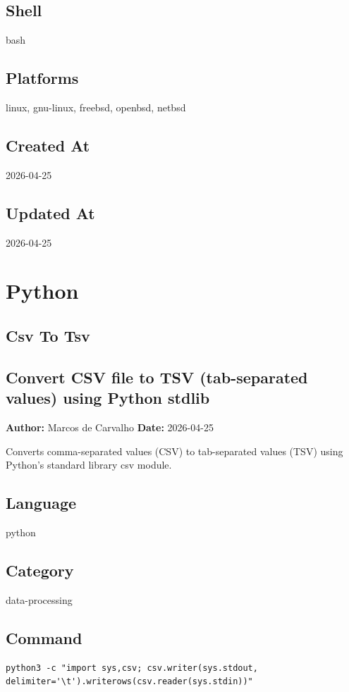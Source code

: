 \documentclass[openany]{book}
\begin{document}
\section*{Shell}
bash

\section*{Platforms}
linux, gnu-linux, freebsd, openbsd, netbsd

\section*{Created At}
2026-04-25

\section*{Updated At}
2026-04-25

\chapter{Python}

\section{Csv To Tsv}
\section*{Convert CSV file to TSV (tab-separated values) using Python stdlib}
\textbf{Author:} Marcos de Carvalho \hfill \textbf{Date:} 2026-04-25

\noindent Converts comma-separated values (CSV) to tab-separated values (TSV) using Python's standard library csv module.

\section*{Language}
python

\section*{Category}
data-processing

\section*{Command}
\begin{lstlisting}
python3 -c "import sys,csv; csv.writer(sys.stdout, delimiter='\t').writerows(csv.reader(sys.stdin))"
\end{lstlisting}
\end{document}
